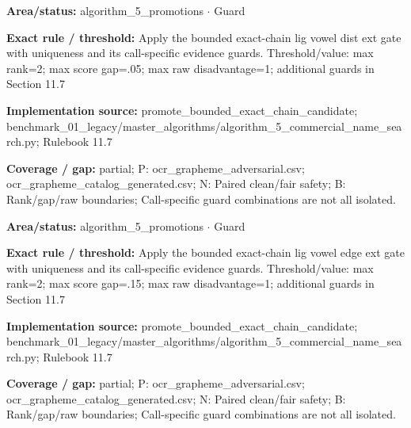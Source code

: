 \begin{tcolorbox}[enhanced,breakable,colback=white,colframe=Muted!45,boxrule=0.45pt,arc=1.5pt,left=6pt,right=6pt,top=5pt,bottom=5pt,title={\texttt{A5-CHAIN-LIG-VOWEL-DIST-EXT}},title after break={\texttt{A5-CHAIN-LIG-VOWEL-DIST-EXT}\ (continued)},fonttitle=\headingfont\bfseries\color{Navy},coltitle=Navy]
\textbf{Area/status:} algorithm\_\allowbreak{}5\_\allowbreak{}promotions $\boldsymbol{\cdot}$ Guard\par
\smallskip
\textbf{Exact rule / threshold:} Apply the bounded exact-chain lig vowel dist ext gate with uniqueness and its call-specific evidence guards. Threshold/\allowbreak{}value: max rank=2; max score gap=.05; max raw disadvantage=1; additional guards in Section 11.7\par
\smallskip
\textbf{Implementation source:} promote\_\allowbreak{}bounded\_\allowbreak{}exact\_\allowbreak{}chain\_\allowbreak{}candidate; benchmark\_\allowbreak{}01\_\allowbreak{}legacy/\allowbreak{}master\_\allowbreak{}algorithms/\allowbreak{}algorithm\_\allowbreak{}5\_\allowbreak{}commercial\_\allowbreak{}name\_\allowbreak{}search.py; Rulebook 11.7\par
\smallskip
\textbf{Coverage / gap:} partial; P: ocr\_\allowbreak{}grapheme\_\allowbreak{}adversarial.csv; ocr\_\allowbreak{}grapheme\_\allowbreak{}catalog\_\allowbreak{}generated.csv; N: Paired clean/\allowbreak{}fair safety; B: Rank/\allowbreak{}gap/\allowbreak{}raw boundaries; Call-specific guard combinations are not all isolated.
\end{tcolorbox}
\begin{tcolorbox}[enhanced,breakable,colback=white,colframe=Muted!45,boxrule=0.45pt,arc=1.5pt,left=6pt,right=6pt,top=5pt,bottom=5pt,title={\texttt{A5-CHAIN-LIG-VOWEL-EDGE-EXT}},title after break={\texttt{A5-CHAIN-LIG-VOWEL-EDGE-EXT}\ (continued)},fonttitle=\headingfont\bfseries\color{Navy},coltitle=Navy]
\textbf{Area/status:} algorithm\_\allowbreak{}5\_\allowbreak{}promotions $\boldsymbol{\cdot}$ Guard\par
\smallskip
\textbf{Exact rule / threshold:} Apply the bounded exact-chain lig vowel edge ext gate with uniqueness and its call-specific evidence guards. Threshold/\allowbreak{}value: max rank=2; max score gap=.15; max raw disadvantage=1; additional guards in Section 11.7\par
\smallskip
\textbf{Implementation source:} promote\_\allowbreak{}bounded\_\allowbreak{}exact\_\allowbreak{}chain\_\allowbreak{}candidate; benchmark\_\allowbreak{}01\_\allowbreak{}legacy/\allowbreak{}master\_\allowbreak{}algorithms/\allowbreak{}algorithm\_\allowbreak{}5\_\allowbreak{}commercial\_\allowbreak{}name\_\allowbreak{}search.py; Rulebook 11.7\par
\smallskip
\textbf{Coverage / gap:} partial; P: ocr\_\allowbreak{}grapheme\_\allowbreak{}adversarial.csv; ocr\_\allowbreak{}grapheme\_\allowbreak{}catalog\_\allowbreak{}generated.csv; N: Paired clean/\allowbreak{}fair safety; B: Rank/\allowbreak{}gap/\allowbreak{}raw boundaries; Call-specific guard combinations are not all isolated.
\end{tcolorbox}
